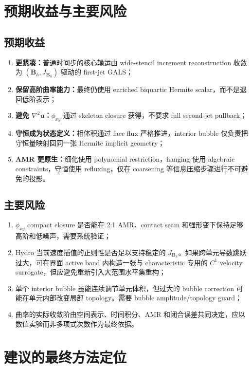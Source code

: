 \documentclass[11pt,a4paper]{ctexart}
\newcommand{\bu}{\bm{u}}
\newcommand{\bB}{\bm{B}}
\begin{document}
\section{预期收益与主要风险}

\subsection{预期收益}
\begin{enumerate}
    \item \textbf{更紧凑：}普通时间步的核心输运由 wide-stencil increment reconstruction 收敛为 $(\bB_h,J_{\bB_h})$ 驱动的 first-jet GALS；
    \item \textbf{保留高阶曲率能力：}最终仍使用 enriched biquartic Hermite scalar，而不是退回低阶表示；
    \item \textbf{避免 $\nabla^2\bu$：}$\phi_{xy}$ 通过 skeleton closure 获得，不要求 full second-jet pullback；
    \item \textbf{守恒成为状态定义：}相体积通过 face flux 严格推进，interior bubble 仅负责把守恒量映射回同一张 Hermite implicit geometry；
    \item \textbf{AMR 更原生：}细化使用 polynomial restriction，hanging 使用 algebraic constraints，守恒使用 refluxing，仅在 coarsening 等信息压缩步骤进行不可避免的投影。
\end{enumerate}

\subsection{主要风险}
\begin{enumerate}
    \item $\phi_{xy}$ compact closure 是否能在 2:1 AMR、contact seam 和强形变下保持足够高阶和低噪声，需要系统验证；
    \item Hydro 当前速度插值的正则性是否足以支持稳定的 $J_{\bB_h}$。如果跨单元导数跳跃过大，可在界面 active band 内构造一张与 characteristic 专用的 $C^1$ velocity surrogate，但应避免重新引入大范围水平集重构；
    \item 单个 interior bubble 虽能连续调节单元体积，但过大的 bubble correction 可能在单元内部改变局部 topology。需要 bubble amplitude/topology guard；
    \item 曲率的实际收敛阶由空间表示、时间积分、AMR 和闭合误差共同决定，应以数值实验而非多项式次数作为最终依据。
\end{enumerate}

\section{建议的最终方法定位}
\end{document}
